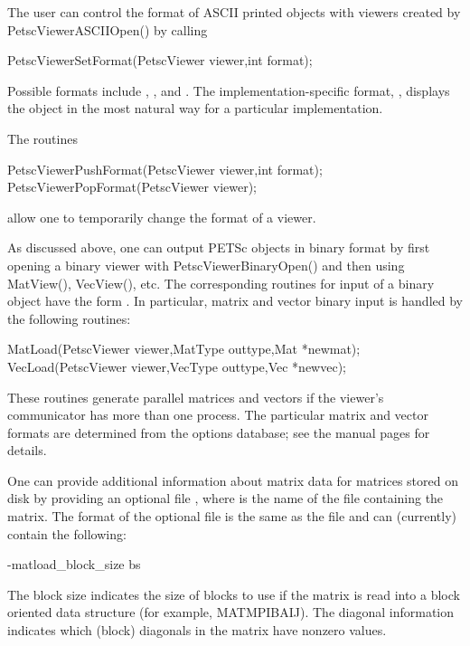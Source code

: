 {{{The user can control the format of ASCII printed objects with viewers 
created by PetscViewerASCIIOpen() by calling
\begin{tabbing}
  PetscViewerSetFormat(PetscViewer viewer,int format);
\end{tabbing}  
  
Possible formats include 
, , and
.  The implementation-specific format, 
, displays the object in the most natural way
for a particular implementation.  

The routines
\begin{tabbing}
  PetscViewerPushFormat(PetscViewer viewer,int format);\\
  PetscViewerPopFormat(PetscViewer viewer);
\end{tabbing} 
allow one to temporarily change the format of a viewer.

As discussed above, one can output PETSc objects in binary format by
first opening a binary viewer with PetscViewerBinaryOpen() and
then using MatView(), VecView(), etc.  The corresponding
routines for input of a binary object have the form .  In
particular, matrix and vector binary input is handled by the
following routines: 
\begin{tabbing}
  MatLoad(PetscViewer viewer,MatType outtype,Mat *newmat);\\
  VecLoad(PetscViewer viewer,VecType outtype,Vec *newvec);
\end{tabbing}
These routines generate parallel matrices and vectors if the viewer's
communicator has more than one process.  The particular matrix and
vector formats are determined from the options database; see the
manual pages for details.

One can provide additional information about matrix data for matrices
stored on disk by providing an optional file ,
where  is the name of the file containing the matrix.
The format of the optional file is the same as the  file 
and can (currently) contain the following:
\begin{tabbing}
   -matload\_block\_size \trl{<}bs\trl{>}
\end{tabbing}
The block size indicates the size of blocks to use if the matrix is
read into a block oriented data structure (for example, 
MATMPIBAIJ). The diagonal information 
 indicates
which (block) diagonals in the matrix have nonzero values.

}}}
